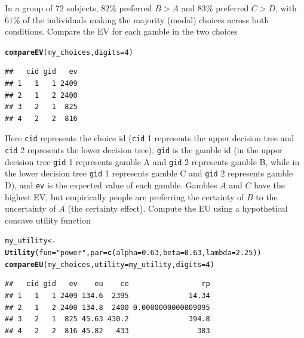 \documentclass{article}\usepackage[]{graphicx}\usepackage[]{color}
\makeatletter
\newcommand{\hlnum}[1]{\textcolor[rgb]{0.686,0.059,0.569}{#1}}%
\newcommand{\hlstr}[1]{\textcolor[rgb]{0.192,0.494,0.8}{#1}}%
\newcommand{\hlstd}[1]{\textcolor[rgb]{0.345,0.345,0.345}{#1}}%
\newcommand{\hlkwb}[1]{\textcolor[rgb]{0.69,0.353,0.396}{#1}}%
\newcommand{\hlkwc}[1]{\textcolor[rgb]{0.333,0.667,0.333}{#1}}%
\newcommand{\hlkwd}[1]{\textcolor[rgb]{0.737,0.353,0.396}{\textbf{#1}}}%
\newenvironment{kframe}{%
 \def\at@end@of@kframe{}%
 \ifinner\ifhmode%
  \def\at@end@of@kframe{\end{minipage}}%
  \begin{minipage}{\columnwidth}%
 \fi\fi%
 \def\FrameCommand##1{\hskip\@totalleftmargin \hskip-\fboxsep
 \colorbox{shadecolor}{##1}\hskip-\fboxsep
     \hskip-\linewidth \hskip-\@totalleftmargin \hskip\columnwidth}%
 \MakeFramed {\advance\hsize-\width
   \@totalleftmargin\z@ \linewidth\hsize
   \@setminipage}}%
 {\par\unskip\endMakeFramed%
 \at@end@of@kframe}
\newenvironment{knitrout}{}{} %
\makeatother
\begin{document}
In a group of $72$ subjects, $82\%$ preferred $B > A$ and $83\%$ preferred $C > D$, with $61\%$ of the individuals
making the majority (modal) choices across both conditions. Compare the EV for each gamble in the two choices

\begin{knitrout}
\color{fgcolor}\begin{kframe}
\begin{alltt}
\hlkwd{compareEV}\hlstd{(my_choices,} \hlkwc{digits}\hlstd{=}\hlnum{4}\hlstd{)}
\end{alltt}
\begin{verbatim}
##   cid gid   ev
## 1   1   1 2409
## 2   1   2 2400
## 3   2   1  825
## 4   2   2  816
\end{verbatim}
\end{kframe}
\end{knitrout}


Here {\tt cid} represents the choice id ({\tt cid} 1 represents the upper decision tree and {\tt cid} 2 represents the lower decision tree), {\tt gid} is the gamble id (in the upper decision tree {\tt gid} 1 represents gamble A and {\tt gid} 2 represents gamble B, while in the lower decision tree {\tt gid} 1 represents gamble C and {\tt gid} 2 represents gamble D), and {\tt ev} is the expected value of each gamble. Gambles $A$ and $C$ have the highest EV, but empirically people are preferring the certainty of $B$ to the uncertainty of $A$ (the certainty effect). Compute the EU using a hypothetical concave utility function

\begin{knitrout}
\color{fgcolor}\begin{kframe}
\begin{alltt}
\hlstd{my_utility} \hlkwb{<-} \hlkwd{Utility}\hlstd{(}\hlkwc{fun}\hlstd{=}\hlstr{"power"}\hlstd{,} \hlkwc{par}\hlstd{=}\hlkwd{c}\hlstd{(}\hlkwc{alpha}\hlstd{=}\hlnum{0.63}\hlstd{,} \hlkwc{beta}\hlstd{=}\hlnum{0.63}\hlstd{,} \hlkwc{lambda}\hlstd{=}\hlnum{2.25}\hlstd{))}
\hlkwd{compareEU}\hlstd{(my_choices,} \hlkwc{utility}\hlstd{=my_utility,} \hlkwc{digits}\hlstd{=}\hlnum{4}\hlstd{)}
\end{alltt}
\begin{verbatim}
##   cid gid   ev    eu    ce                 rp
## 1   1   1 2409 134.6  2395              14.34
## 2   1   2 2400 134.8  2400 0.0000000000009095
## 3   2   1  825 45.63 430.2              394.8
## 4   2   2  816 45.82   433                383
\end{verbatim}
\end{kframe}
\end{knitrout}
\end{document}
